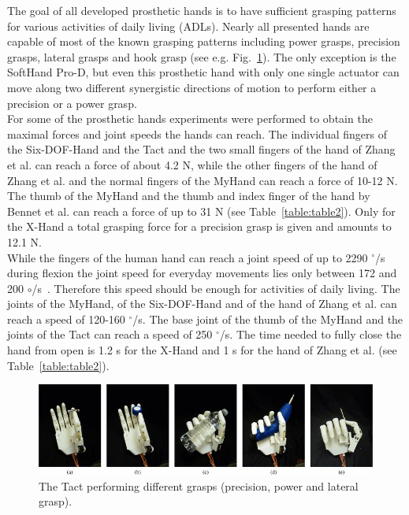 \documentclass[a4paper, 10pt, conference]{ieeeconf}      %
\begin{document}
The goal of all developed prosthetic hands is to have sufficient grasping patterns for various activities of daily living (ADLs). Nearly all presented hands are capable of most of the known grasping patterns including power grasps, precision grasps, lateral grasps and hook grasp (see e.g. Fig.~\ref{fig:grasps}). The only exception is the SoftHand Pro-D, but even this prosthetic hand with only one single actuator can move along two different synergistic directions of motion to perform either a precision or a power grasp.\\
For some of the prosthetic hands experiments were performed to obtain the maximal forces and joint speeds the hands can reach. The individual fingers of the Six-DOF-Hand and the Tact and the two small fingers of the hand of Zhang et al. can reach a force of about 4.2 N, while the other fingers of the hand of Zhang et al. and the normal fingers of the MyHand can reach a force of 10-12 N. The thumb of the MyHand and the thumb and index finger of the hand by Bennet et al. can reach a force of up to 31 N (see Table~\ref{table:table2}). Only for the X-Hand a total grasping force for a precision grasp is given and amounts to 12.1 N.\\
While the fingers of the human hand can reach a joint speed of up to 2290 $^\circ$/s during flexion the joint speed for everyday movements lies only between 172 and 200 $\circ$/s~\cite{weir}. Therefore this speed should be enough for activities of daily living. The joints of the MyHand, of the Six-DOF-Hand and of the hand of Zhang et al. can reach a speed of 120-160 $^\circ$/s. The base joint of the thumb of the MyHand and the joints of the Tact can reach a speed of 250 $^\circ$/s. The time needed to fully close the hand from open is 1.2 s for the X-Hand and 1 s for the hand of Zhang et al. (see Table~\ref{table:table2}).

\begin{figure}[h]

	\centering
	\includegraphics[scale=0.4]{images/Tact2}
		
	\caption{The Tact performing different grasps (precision, power and lateral grasp).}
	\label{fig:grasps}
\end{figure}
\end{document}
